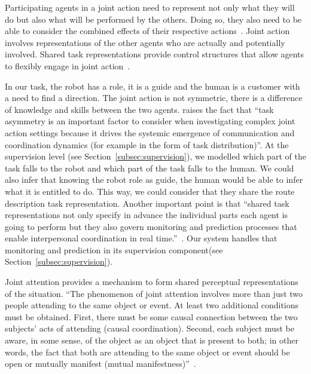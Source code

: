 \documentclass[a4paper,11pt,twoside]{StyleThese}
\begin{document}
Participating agents in a joint action need to represent not only what they will do but also what will be performed by the others. Doing so, they also need to be able to consider the combined effects of their respective actions~\cite{pacherie_2012_agency}. Joint action involves representations of the other agents who are actually and potentially involved. Shared task representations provide control structures that allow agents to flexibly engage in joint action~\cite{knoblich_2011_joint}.

In our task, the robot has a role, it is a guide and the human is a customer with a need to find a direction. The joint action is not symmetric, there is a difference of knowledge and skills between the two agents. \cite{curioni_2017_joint} raises the fact that ``task asymmetry is an important factor to consider when investigating complex joint action settings because it drives the systemic emergence of communication and coordination dynamics (for example in the form of task distribution)''. At the supervision level (see Section~\ref{subsec:supervision}), we modelled which part of the task falls to the robot and which part of the task falls to the human. We could also infer that knowing the robot role as guide, the human would be able to infer what it is entitled to do. This way, we could consider that they share the route description task representation. 
Another important point is that ``shared task representations not only specify in advance the individual parts each agent is going to perform but they also govern monitoring and prediction processes that enable interpersonal coordination in real time.''~\cite{knoblich_2011_joint}. Our system handles that monitoring and prediction in its supervision component(see Section~\ref{subsec:supervision}).


Joint attention provides a mechanism to form shared perceptual representations of the situation. ``The phenomenon of joint attention involves more than just two people attending to the same object or event. At least two additional conditions must be obtained. First, there must be some causal connection between the two subjects’ acts of attending (causal coordination). Second, each subject must be aware, in some sense, of the object as an object that is present to both; in other words, the fact that both are attending to the same object or event should be open or mutually manifest (mutual manifestness)''~\cite[p.~355]{pacherie_2012_agency}.
\end{document}
